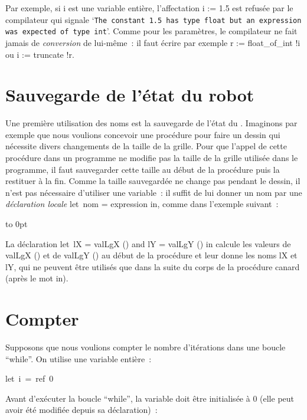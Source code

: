\noindent  Par exemple, si {\idt i} est une variable entière, l'affectation {\idt i := 1.5} est
refusée par le compilateur qui signale `{\tt The constant 1.5 has type float but an expression was
expected of type int}'. Comme pour les paramètres, le compilateur ne fait jamais de
{\em conversion} de lui-même~: il faut écrire par exemple
{\idt r := float\_of\_int !i} ou {\idt i := truncate !r}.

\section{Sauvegarde de l'état du robot}

Une première utilisation des noms est la sauvegarde de l'état du \robot. Imaginons par
exemple que nous voulions concevoir une procédure pour faire un dessin qui nécessite divers
changements de la taille de la grille. Pour que l'appel de
cette procédure dans un programme ne modifie pas la taille de la grille utilisée dans le
programme, il faut sauvegarder cette
taille au début de la procédure puis la restituer à la fin. Comme la taille sauvegardée ne change
pas pendant le dessin, il n'est pas nécessaire d'utiliser une variable~: il suffit de lui donner un
nom par une {\em déclaration locale}
{\mcl let}\ {\idt nom = expression} {\mcl in}, comme dans l'exemple suivant~:

{\raggedright
 \vbox to 0pt{}%
 
 }

\noindent La déclaration {\mcl let}\ {\idt lX = valLgX ()} {\mcl and} {\idt lY = valLgY ()} {\mcl in}
calcule les valeurs de {\idt valLgX ()} et de {\idt valLgY ()} au début de la procédure et
leur donne les noms {\idt lX} et {\idt lY}, qui ne peuvent être utilisés que dans la suite du
corps de la procédure {\idt canard} (après le mot {\mcl in}).

\section{Compter}
Supposons que nous voulions
compter le nombre d'itérations dans une boucle ``while''. On utilise une variable entière~:

\mbox{\blc  \blk\idt  \mcl let\idt\ i\ =\ ref\ 0}\par

\noindent Avant d'exécuter la boucle ``while'', la variable doit être initialisée à 0
(elle peut avoir été modifiée depuis sa déclaration)~:

